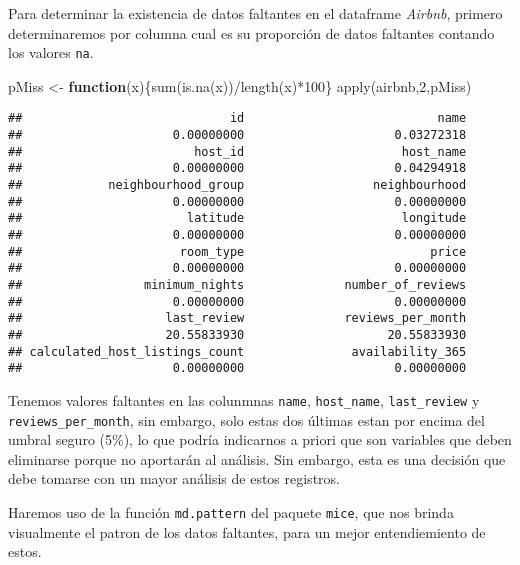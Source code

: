 \documentclass[
]{book}
\newenvironment{Shaded}{\begin{snugshade}}{\end{snugshade}}
\newcommand{\ControlFlowTok}[1]{\textcolor[rgb]{0.13,0.29,0.53}{\textbf{#1}}}
\newcommand{\DecValTok}[1]{\textcolor[rgb]{0.00,0.00,0.81}{#1}}
\newcommand{\FunctionTok}[1]{\textcolor[rgb]{0.00,0.00,0.00}{#1}}
\newcommand{\NormalTok}[1]{#1}
\newcommand{\OtherTok}[1]{\textcolor[rgb]{0.56,0.35,0.01}{#1}}
\newcommand{\SpecialCharTok}[1]{\textcolor[rgb]{0.00,0.00,0.00}{#1}}
\begin{document}
Para determinar la existencia de datos faltantes en el dataframe \emph{Airbnb}, primero determinaremos por columna cual es su proporción de datos faltantes contando los valores \texttt{na}.

\begin{Shaded}
\begin{Highlighting}[]
\NormalTok{pMiss }\OtherTok{\textless{}{-}} \ControlFlowTok{function}\NormalTok{(x)\{}\FunctionTok{sum}\NormalTok{(}\FunctionTok{is.na}\NormalTok{(x))}\SpecialCharTok{/}\FunctionTok{length}\NormalTok{(x)}\SpecialCharTok{*}\DecValTok{100}\NormalTok{\}}
\FunctionTok{apply}\NormalTok{(airbnb,}\DecValTok{2}\NormalTok{,pMiss)}
\end{Highlighting}
\end{Shaded}

\begin{verbatim}
##                             id                           name 
##                     0.00000000                     0.03272318 
##                        host_id                      host_name 
##                     0.00000000                     0.04294918 
##            neighbourhood_group                  neighbourhood 
##                     0.00000000                     0.00000000 
##                       latitude                      longitude 
##                     0.00000000                     0.00000000 
##                      room_type                          price 
##                     0.00000000                     0.00000000 
##                 minimum_nights              number_of_reviews 
##                     0.00000000                     0.00000000 
##                    last_review              reviews_per_month 
##                    20.55833930                    20.55833930 
## calculated_host_listings_count               availability_365 
##                     0.00000000                     0.00000000
\end{verbatim}

Tenemos valores faltantes en las colunmnas \texttt{name}, \texttt{host\_name}, \texttt{last\_review} y \texttt{reviews\_per\_month}, sin embargo, solo estas dos últimas estan por encima del umbral seguro (5\%), lo que podría indicarnos a priori que son variables que deben eliminarse porque no aportarán al análisis. Sin embargo, esta es una decisión que debe tomarse con un mayor análisis de estos registros.

Haremos uso de la función \texttt{md.pattern} del paquete \texttt{mice}, que nos brinda visualmente el patron de los datos faltantes, para un mejor entendiemiento de estos.
\end{document}
